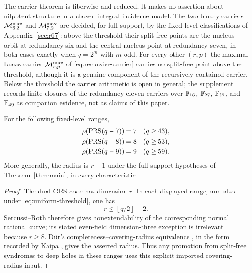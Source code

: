 The carrier theorem is fiberwise and reduced.  It makes no assertion about
nilpotent structure in a chosen integral incidence model.  The two binary
carriers \(\mathcal M^{\max}_{6,2}\) and \(\mathcal M^{\max}_{7,2}\) are decided, for full
support, by the fixed-level classifications of Appendix~\ref{sec:r67}: above
the threshold
their split-free points are the nucleus orbit at redundancy six and the
central nucleus point at redundancy seven, in both cases exactly when
\(q=2^m\) with \(m\) odd.  For every other \((r,p)\) the maximal
Lucas carrier \(\mathcal M^{\max}_{r,p}\) of \eqref{eq:recursive-carrier} carries no
split-free point above the threshold, although it is a genuine component of
the recursively contained carrier.  Below the threshold the carrier
arithmetic is open in general; the supplement records finite closures of
the redundancy-eleven carriers over \(\mathbb F_{16}\), \(\mathbb F_{27}\), \(\mathbb F_{32}\),
and \(\mathbb F_{49}\) as companion evidence, not as claims of this paper.

\begin{proposition}\label{prop:upper-radius}%
%
%
For the following fixed-level ranges,
\[
\begin{aligned}
 \rho(\operatorname{PRS}(q-7))&=7 &&(q\geq43),\\
 \rho(\operatorname{PRS}(q-8))&=8 &&(q\geq53),\\
 \rho(\operatorname{PRS}(q-9))&=9 &&(q\geq59).
\end{aligned}
\]
More generally, the radius is \(r-1\) under the full-support
hypotheses of Theorem~\ref{thm:main}, in every characteristic.
\end{proposition}

\begin{proof}
The dual GRS code has dimension \(r\).  In each displayed range, and also
under \eqref{eq:uniform-threshold}, one has
\[
                         r\leq\left\lfloor q/2\right\rfloor+2.
\]
Seroussi--Roth \cite[Cor.~1]{SeroussiRoth1986} therefore gives
nonextendability of the corresponding normal rational curve; its stated
even-field dimension-three exception is irrelevant because \(r\geq8\).
Dür's completeness--covering-radius equivalence \cite{Dur1994}, in the
form recorded by Kaipa \cite[Sec.~IV and Prop.~4(1)]{Kaipa2017}, gives
the asserted radius.  Thus any promotion from split-free syndromes to deep
holes in these ranges uses this explicit imported covering-radius input.
\end{proof}
